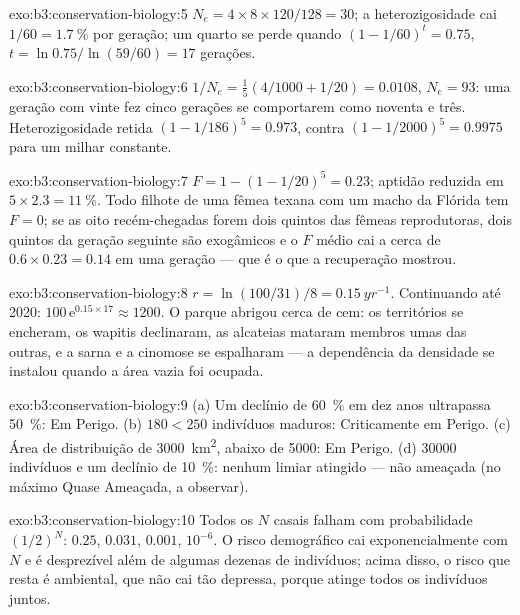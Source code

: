 \begin{solution}{exo:b3:conservation-biology:5}
$N_{e} = 4\times 8\times 120/128 = 30$; a heterozigosidade cai $1/60 =
\qty{1.7}{\%}$ por geração; um quarto se perde quando $(1 - 1/60)^{t} =
0.75$, $t = \ln 0.75/\ln(59/60) = 17$ gerações.
\end{solution}

\begin{solution}{exo:b3:conservation-biology:6}
$1/N_{e} = \tfrac{1}{5}(4/1000 + 1/20) = 0.0108$, $N_{e} = 93$: uma
geração com vinte fez cinco gerações se comportarem como noventa e três.
Heterozigosidade retida $(1 - 1/186)^{5} = 0.973$, contra $(1 -
1/2000)^{5} = 0.9975$ para um milhar constante.
\end{solution}

\begin{solution}{exo:b3:conservation-biology:7}
$F = 1 - (1 - 1/20)^{5} = 0.23$; aptidão reduzida em $5\times 2.3 = \qty{11}{\%}$. Todo filhote de uma fêmea texana com um macho da Flórida
tem $F = 0$; se as oito recém-chegadas forem dois quintos das fêmeas
reprodutoras, dois quintos da geração seguinte são exogâmicos e o $F$
médio cai a cerca de $0.6\times 0.23 = 0.14$ em uma geração --- que é o
que a recuperação mostrou.
\end{solution}

\begin{solution}{exo:b3:conservation-biology:8}
$r = \ln(100/31)/8 = \qty{0.15}{yr^{-1}}$. Continuando até 2020:
$100\,\mathrm{e}^{0.15\times 17} \approx 1200$. O parque abrigou cerca de
cem: os territórios se encheram, os wapitis declinaram, as alcateias
mataram membros umas das outras, e a sarna e a cinomose se espalharam ---
a dependência da densidade se instalou quando a área vazia foi ocupada.
\end{solution}

\begin{solution}{exo:b3:conservation-biology:9}
(a) Um declínio de \qty{60}{\%} em dez anos ultrapassa \qty{50}{\%}: Em
Perigo. (b) $180 < 250$ indivíduos maduros: Criticamente em Perigo. (c)
Área de distribuição de \qty{3000}{km^2}, abaixo de \qty{5000}{}: Em
Perigo. (d) \num{30000} indivíduos e um declínio de \qty{10}{\%}: nenhum
limiar atingido --- não ameaçada (no máximo Quase Ameaçada, a observar).
\end{solution}

\begin{solution}{exo:b3:conservation-biology:10}
Todos os $N$ casais falham com probabilidade $(1/2)^{N}$: $0.25$,
$0.031$, $0.001$, $10^{-6}$. O risco demográfico cai exponencialmente com
$N$ e é desprezível além de algumas dezenas de indivíduos; acima disso, o
risco que resta é ambiental, que não cai tão depressa, porque atinge
todos os indivíduos juntos.
\end{solution}

